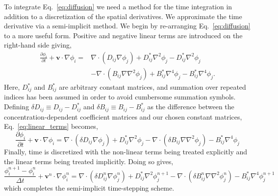 \documentclass[journal=mamobx,manuscript=suppinfo]{achemso}
\begin{document}
To integrate Eq.~\ref{eq:diffusion} we need a method for the time integration in addition to a discretization of the spatial derivatives.
We approximate the time derivative via a semi-implicit method.
We begin by re-arranging Eq.~\ref{eq:diffusion} to a more useful form.
Positive and negative linear terms are introduced on the right-hand side giving,
\begin{equation} \label{eq:linear_terms}
\begin{split}
  \frac{\partial \phi_{i}}{\partial t} + \bm{v} \cdot \nabla \phi_{i} =
    & \nabla \cdot \left ( D_{ij} \nabla \phi_{j} \right )
    + D^{*}_{ij} \nabla^{2} \phi_{j} - D^{*}_{ij} \nabla^{2} \phi_{j} \\
    & - \nabla \cdot \left ( B_{ij} \nabla \nabla^{2} \phi_{j} \right )
    + B^{*}_{ij} \nabla^{4} \phi_{j} - B^{*}_{ij} \nabla^{4} \phi_{j} \textbf{.}
\end{split}
\end{equation}
Here, $D^{*}_{ij}$ and $B^{*}_{ij}$ are arbitrary constant matrices\footnotemark{}, and summation over repeated indices has been assumed in order to avoid cumbersome summation symbols.%
Defining $\delta D_{ij} \equiv D_{ij} - D^{*}_{ij}$ and $\delta B_{ij} \equiv B_{ij} - B^{*}_{ij}$ as the difference between the concentration-dependent coefficient matrices and our chosen constant matrices, Eq.~\ref{eq:linear_terms} becomes,
\begin{equation}
  \frac{\partial \phi_{i}}{\partial t} + \bm{v} \cdot \nabla \phi_{i} =
    \nabla \cdot \left ( \delta D_{ij} \nabla \phi_{j} \right )
    + D^{*}_{ij} \nabla^{2} \phi_{j} 
    - \nabla \cdot \left ( \delta B_{ij} \nabla \nabla^{2} \phi_{j} \right )
    - B^{*}_{ij} \nabla^{4} \phi_{j}
\end{equation}
Finally, time is discretized with the non-linear terms being treated explicitly and the linear terms being treated implicitly.
Doing so gives,
\begin{equation} \label{eq:time_disc}
  \frac{\phi_{i}^{n+1} - \phi_{i}^{n}}{\Delta t} + \bm{v}^{n} \cdot \nabla \phi_{i}^{n} =
    \nabla \cdot \left ( \delta D_{ij}^{n} \nabla \phi_{j}^{n} \right )
    + D^{*}_{ij} \nabla^{2} \phi_{j}^{n+1} 
    - \nabla \cdot \left ( \delta B_{ij}^{n} \nabla \nabla^{2} \phi_{j}^{n} \right )
    - B^{*}_{ij} \nabla^{4} \phi_{j}^{n+1}
\end{equation}
which completes the semi-implicit time-stepping scheme.
\end{document}

